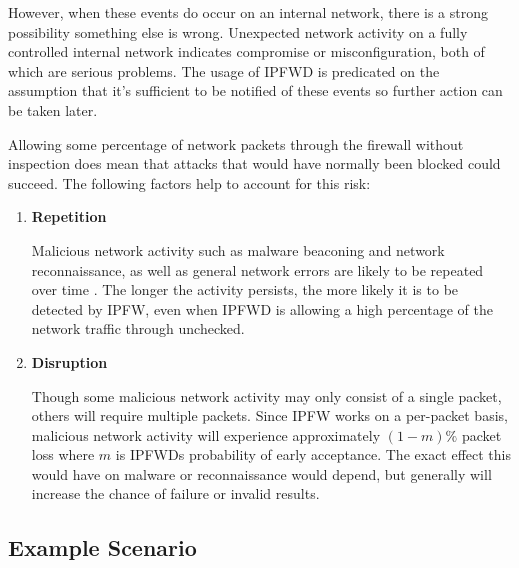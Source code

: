 \documentclass[journal]{IEEEtran}
\begin{document}
  However, when these events do occur on an internal network, there is a strong
  possibility something else is wrong. Unexpected network activity on a fully
  controlled internal network indicates compromise or misconfiguration, both of
  which are serious problems. The usage of IPFWD is predicated on the
  assumption that it's sufficient to be notified of these events so further
  action can be taken later.

  Allowing some percentage of network packets through the firewall without
  inspection does mean that attacks that would have normally been blocked could
  succeed. The following factors help to account for this risk:

  \begin{enumerate}

    \item \textbf{Repetition} 

      Malicious network activity such as malware beaconing and network
      reconnaissance, as well as general network errors are likely to be
      repeated over time \cite{beacondetection}. The longer the activity
      persists, the more likely it is to be detected by IPFW, even when IPFWD
      is allowing a high percentage of the network traffic through unchecked.

    \item \textbf{Disruption} 

      Though some malicious network activity may only consist of a single
      packet, others will require multiple packets. Since IPFW works on a
      per-packet basis, malicious network activity will experience
      approximately $(1 - m)\%$ packet loss where $m$ is IPFWDs probability of early
      acceptance. The exact effect this would have on malware or reconnaissance
      would depend, but generally will increase the chance of failure or
      invalid results.

  \end{enumerate}



  \subsection{Example Scenario} 
\end{document}
